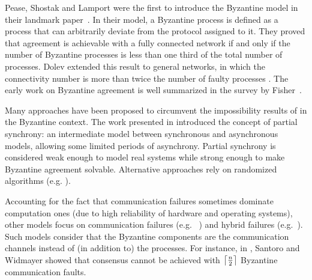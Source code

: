 \documentclass[11pt]{article}
\DeclarePairedDelimiter\ceil{\lceil}{\rceil}
\begin{document}
Pease, Shostak and Lamport were the first to introduce
the Byzantine model in their landmark
paper~\cite{lamport1982byzantine,pease1980reaching}.
In their model, a Byzantine process is defined as a process that can
arbitrarily deviate from the protocol assigned to it.
They proved that  agreement is achievable
with a fully connected network if and only if the number of Byzantine
processes is less than one third of the total number of
processes. Dolev extended this
result to general networks, in which the connectivity number is more than twice
the number of faulty processes \cite{dolev1982byzantine}.
The early work on Byzantine agreement
is well summarized in the survey by Fisher~{\cite{fischer1983consensus}}.

Many approaches have been proposed to circumvent the impossibility results of
\cite{fischer1985impossibility} in the Byzantine context.
The work presented in \cite{dwork1988consensus} introduced the concept
of partial synchrony: an intermediate model between
synchronous and asynchronous models, allowing some
limited periods of asynchrony. Partial synchrony is considered weak enough to model  real systems
while  strong enough to make Byzantine agreement solvable.
Alternative approaches rely on randomized algorithms (e.g.
{\cite{braud2013fast,dwork1988fault,king2011load,rabin1983randomized}}).

Accounting for the fact that communication failures sometimes dominate
computation ones (due to high reliability of hardware and operating systems), other models
focus on communication failures (e.g.
~{\cite{perry1986distributed,schmid2002formally}}) and hybrid failures
(e.g.~{\cite{gong1998byzantine,lincoln1993formally}}). Such models
consider that the Byzantine components are the communication channels instead of 
(in addition to) the processes.
For instance, in \cite{santoro1989time,santoro2007agreement}, Santoro and Widmayer
showed that consensus cannot be achieved with $\ceil*{\frac{n}{2}}$
Byzantine communication faults.
%
\end{document}
